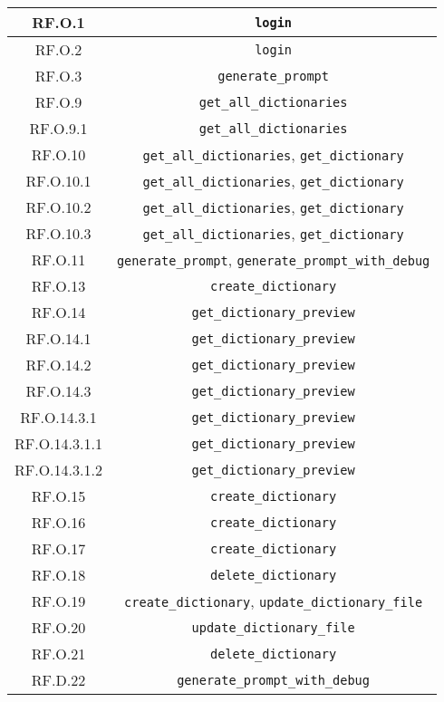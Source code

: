 \begin{adjustwidth}{-0.5cm}{-0.5cm}
\begin{longtable}{|c|c|}
    RF.O.1 & \texttt{login} \\
	  \hline RF.O.2 & \texttt{login} \\
    \hline RF.O.3 & \texttt{generate\_prompt}\\
    \hline RF.O.9 & \texttt{get\_all\_dictionaries} \\
    \hline RF.O.9.1 & \texttt{get\_all\_dictionaries} \\
    \hline RF.O.10 & \texttt{get\_all\_dictionaries}, \texttt{get\_dictionary} \\
    \hline RF.O.10.1 & \texttt{get\_all\_dictionaries}, \texttt{get\_dictionary} \\
    \hline RF.O.10.2 & \texttt{get\_all\_dictionaries}, \texttt{get\_dictionary} \\
    \hline RF.O.10.3 & \texttt{get\_all\_dictionaries}, \texttt{get\_dictionary} \\
    \hline RF.O.11 & \texttt{generate\_prompt}, \texttt{generate\_prompt\_with\_debug} \\
    \hline RF.O.13 & \texttt{create\_dictionary} \\
    \hline RF.O.14 & \texttt{get\_dictionary\_preview} \\
    \hline RF.O.14.1 & \texttt{get\_dictionary\_preview} \\
    \hline RF.O.14.2 & \texttt{get\_dictionary\_preview} \\
    \hline RF.O.14.3 & \texttt{get\_dictionary\_preview} \\
    \hline RF.O.14.3.1 & \texttt{get\_dictionary\_preview} \\
    \hline RF.O.14.3.1.1 & \texttt{get\_dictionary\_preview} \\
    \hline RF.O.14.3.1.2 & \texttt{get\_dictionary\_preview} \\
    \hline RF.O.15 & \texttt{create\_dictionary} \\
    \hline RF.O.16 & \texttt{create\_dictionary} \\
    \hline RF.O.17 & \texttt{create\_dictionary} \\
    \hline RF.O.18 & \texttt{delete\_dictionary} \\
    \hline RF.O.19 & \texttt{create\_dictionary}, \texttt{update\_dictionary\_file} \\
    \hline RF.O.20 & \texttt{update\_dictionary\_file} \\
    \hline RF.O.21 & \texttt{delete\_dictionary} \\
    \hline RF.D.22 & \texttt{generate\_prompt\_with\_debug} \\

\end{longtable}
\end{adjustwidth}
